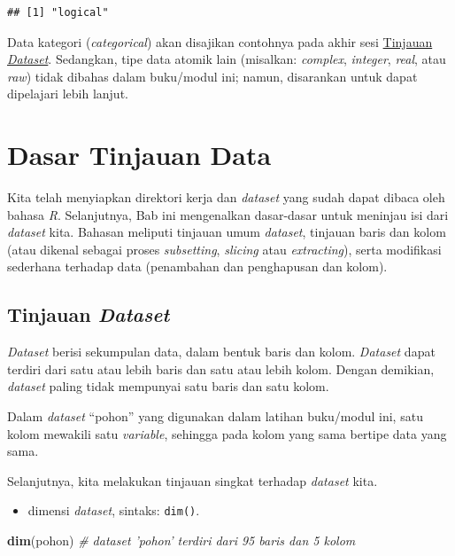 \documentclass[
  12pt,
  a4paper,
]{scrbook}
\newenvironment{Shaded}{\begin{snugshade}}{\end{snugshade}}
\newcommand{\CommentTok}[1]{\textcolor[rgb]{0.56,0.35,0.01}{\textit{#1}}}
\newcommand{\KeywordTok}[1]{\textcolor[rgb]{0.13,0.29,0.53}{\textbf{#1}}}
\newcommand{\NormalTok}[1]{#1}
\providecommand{\tightlist}{%
  \setlength{\itemsep}{0pt}\setlength{\parskip}{0pt}}
\begin{document}
\begin{verbatim}
## [1] "logical"
\end{verbatim}

Data kategori (\emph{categorical}) akan disajikan contohnya pada akhir
sesi \protect\hyperlink{tinjauan-dataset}{Tinjauan \emph{Dataset}}.
Sedangkan, tipe data atomik lain (misalkan: \emph{complex},
\emph{integer}, \emph{real}, atau \emph{raw}) tidak dibahas dalam
buku/modul ini; namun, disarankan untuk dapat dipelajari lebih lanjut.

\newpage

\hypertarget{dasar-tinjauan-data}{%
\chapter{Dasar Tinjauan Data}\label{dasar-tinjauan-data}}

Kita telah menyiapkan direktori kerja dan \emph{dataset} yang sudah
dapat dibaca oleh bahasa \emph{R}. Selanjutnya, Bab ini mengenalkan
dasar-dasar untuk meninjau isi dari \emph{dataset} kita. Bahasan
meliputi tinjauan umum \emph{dataset}, tinjauan baris dan kolom (atau
dikenal sebagai proses \emph{subsetting}, \emph{slicing} atau
\emph{extracting}), serta modifikasi sederhana terhadap data (penambahan
dan penghapusan dan kolom).

\hypertarget{tinjauan-dataset}{%
\section{\texorpdfstring{Tinjauan
\emph{Dataset}}{Tinjauan Dataset}}\label{tinjauan-dataset}}

\emph{Dataset} berisi sekumpulan data, dalam bentuk baris dan kolom.
\emph{Dataset} dapat terdiri dari satu atau lebih baris dan satu atau
lebih kolom. Dengan demikian, \emph{dataset} paling tidak mempunyai satu
baris dan satu kolom.

Dalam \emph{dataset} ``pohon'' yang digunakan dalam latihan buku/modul
ini, satu kolom mewakili satu \emph{variable}, sehingga pada kolom yang
sama bertipe data yang sama.

Selanjutnya, kita melakukan tinjauan singkat terhadap \emph{dataset}
kita.

\begin{itemize}
\tightlist
\item
  dimensi \emph{dataset}, sintaks: \texttt{dim()}.
\end{itemize}

\begin{Shaded}
\begin{Highlighting}[]
\KeywordTok{dim}\NormalTok{(pohon)  }\CommentTok{# dataset 'pohon' terdiri dari 95 baris dan 5 kolom}
\end{Highlighting}
\end{Shaded}
\end{document}
